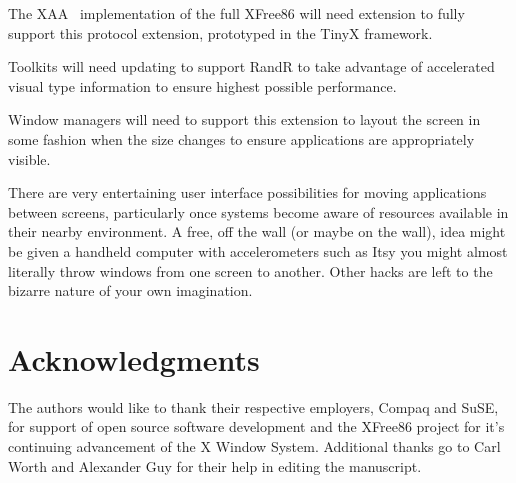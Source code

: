 \documentclass[twocolumn]{article}
\begin{document}
The XAA~\cite{xaa} implementation of the full XFree86 will need
extension to fully support this protocol extension, prototyped in the
TinyX framework.

Toolkits will need updating to support RandR to take advantage of
accelerated visual type information to ensure highest possible
performance.

Window managers will need to support this extension to layout the
screen in some fashion when the size changes to ensure applications
are appropriately visible.

There are very entertaining user interface possibilities for moving
applications between screens, particularly once systems become aware
of resources available in their nearby environment. A free, off the
wall (or maybe on the wall), idea might be given a handheld computer
with accelerometers such as Itsy\cite{Itsy} you might almost literally
throw windows from one screen to another.  Other hacks are left to the
bizarre nature of your own imagination.

\section*{Acknowledgments}

The authors would like to thank their respective employers, Compaq and SuSE,
for support of open source software development and the XFree86 project for
it's continuing advancement of the X Window System.  Additional thanks go to
Carl Worth and Alexander Guy for their help in editing the manuscript.



\end{document}
